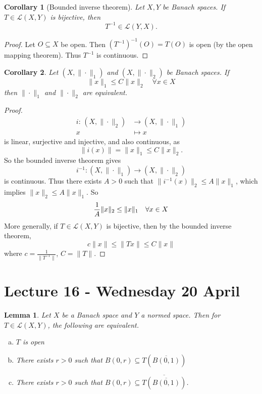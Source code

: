 \documentclass[10pt, reqno, oneside]{amsart}
\theoremstyle{plain}%
\newtheorem{lem}[thm]{Lemma}
\newtheorem*{cor}{Corollary}
\theoremstyle{definition}
\theoremstyle{remark}
\newcommand{\mapping}[5]{\begin{align*}
	#1 : \,     #2 &\rightarrow #3 \\
			#4  &\mapsto #5
\end{align*}	
}
\begin{document}
\begin{cor}[Bounded inverse theorem]
	Let $X, Y$ be Banach spaces.  If $T \in \mathcal L(X,Y)$ is bijective, then \[
		T^{-1} \in \mathcal L(Y,X).
	\]
	
\end{cor}
\begin{proof}
	Let $O \subseteq X$ be open.  Then $(T^{-1})^{-1}(O) = T(O)$ is open (by the open mapping theorem).  Thus $T^{-1}$ is continuous.
\end{proof}

\begin{cor}
	Let $(X, \| \cdot \|_1)$ and $(X, \| \cdot \|_2)$ be Banach spaces.  If \[
		\| x \|_1 \leq C \| x \|_2 \quad \forall x \in X
	\] then $\| \cdot \|_1$ and $\| \cdot \|_2$ are equivalent.  
\end{cor}
\begin{proof}
	\mapping{i}{(X, \| \cdot \|_2)}{(X, \| \cdot \|_1)}{ x}{x} is linear, surjective and injective, and also continuous, as \[
		\|i(x) \| = \| x \|_1 \leq C \| x \|_2.
	\]  So the bounded inverse theorem gives \[
		i^{-1} : (X, \| \cdot \|_1) \rightarrow (X, \| \cdot \|_2)
	\] is continuous.  Thus there exists $A > 0$ such that $\| i^{-1}(x)\|_2 \leq A \| x \|_1$, which implies $\| x \|_2 \leq A \| x \|_1$.  So \[
		\frac{1}{A} \| x \|_2 \leq \| x \|_1 \quad \forall x \in X \qedhere
	\]  More generally, if $T \in \mathcal L(X,Y)$ is bijective, then by the bounded inverse theorem, \[
		c \| x \| \leq \| Tx \| \leq C \| x \|
	\] where $c  = \frac{1}{ \| T^{-1} \|}$, $C = \| T \|$.  
\end{proof} 

\section{Lecture 16 - Wednesday 20 April} %
\label{sec:lecture_16_wednesday_20_april}


\begin{lem}
	Let $X$ be a Banach space and $Y$ a normed space.  Then for $T \in \mathcal L(X, Y)$, the following are equivalent.
	\begin{enumerate}[(a)]
		\item $T$ is open
		\item There exists $r > 0$ such that $B(0, r) \subseteq T(\overline{B(0, 1)})$
		\item There exists $r > 0$ such that $B(0, r) \subseteq \overline{T(\overline{B(0, 1)})}$.
	\end{enumerate} 
\end{lem}
\end{document}
